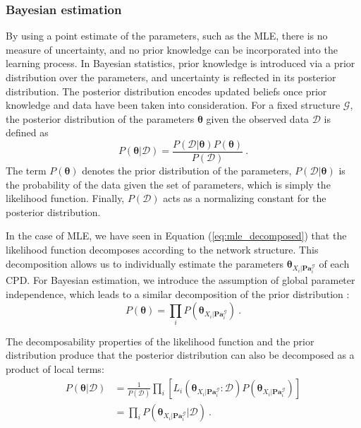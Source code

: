 \subsubsection{Bayesian estimation} \label{sec:2_bayesian_estimations}
By using a point estimate of the parameters, such as the MLE, there is no measure of uncertainty, and no prior knowledge can be incorporated into the learning process. In Bayesian statistics, prior knowledge is introduced via a prior distribution over the parameters, and uncertainty is reflected in its posterior distribution. The posterior distribution encodes updated beliefs once prior knowledge and data have been taken into consideration. For a fixed structure $\mathcal{G}$, the posterior distribution of the parameters $\bm{\theta}$ given the observed data $\mathcal{D}$ is defined as
\begin{equation*}
P(\bm{\theta} | \mathcal{D}) = \frac{P(\mathcal{D|\bm{\theta}})P(\bm{\theta})}{P(\mathcal{D})} \ .
\end{equation*}
The term $P(\bm{\theta})$ denotes the prior distribution of the parameters, $P(\mathcal{D}|\bm{\theta})$ is the probability of the data given the set of parameters, which is simply the likelihood function. Finally, $P(\mathcal{D})$ acts as a normalizing constant for the posterior distribution. 

In the case of MLE, we have seen in Equation (\ref{eq:mle_decomposed}) that the likelihood function decomposes according to the network structure. This decomposition allows us to individually estimate the parameters $\bm{\theta}_{X_{i} | \mathbf{Pa}^{\mathcal{G}}_{i}}$ of each CPD. For Bayesian estimation, we introduce the assumption of global parameter independence, which leads to a similar decomposition of the prior distribution \citep{spiegelhalter1990}:
\begin{equation*}
P(\bm{\theta}) = \prod_{i} P(\bm{\theta}_{X_{i} | \mathbf{Pa}^{\mathcal{G}}_{i}}) \ .
\end{equation*}

The decomposability properties of the likelihood function and the prior distribution produce that the posterior distribution can also be decomposed as a product of local terms:
\begin{align*}
P(\bm{\theta} | \mathcal{D}) 
&= \frac{1}{P(\mathcal{D})} \prod_{i} \left[L_{i}(\bm{\theta}_{X_{i} | \mathbf{Pa}^{\mathcal{G}}_{i}} : \mathcal{D}) P(\bm{\theta}_{X_{i} | \mathbf{Pa}^{\mathcal{G}}_{i}}) \right] \\
&= \prod_{i} P(\bm{\theta}_{X_{i} | \mathbf{Pa}^{\mathcal{G}}_{i}} | \mathcal{D}) \ .
\end{align*}


